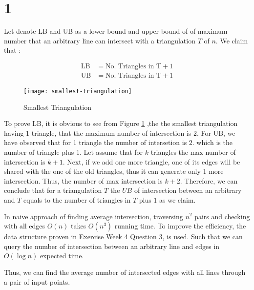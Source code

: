 
\section*{1}

Let denote LB and UB as a lower bound and upper bound of
of maximum number that an arbitrary line can intersect with a
triangulation $T$ of $n$. We claim that :

\begin{align*}
    \mathrm{LB} &= \text{No. Triangles in T} + 1\\
    \mathrm{UB} &= \text{No. Triangles in T} + 1
\end{align*}
\begin{figure}[h]
    \begin{center}
        \texttt{[image: smallest-triangulation]}
        \caption{Smallest Triangulation}
        \label{fig:smallest-triangulation}
    \end{center}
\end{figure}

To prove LB, it is obvious to see from Figure \ref{fig:smallest-triangulation}
,the the smallest triangulation having 1 triangle, that the maximum number of intersection is $2$.
For UB, we have observed that for 1 triangle the number of intersetion is $2$.
which is the number of triangle plus 1. Let assume that for $k$ triangles
the max number of intersection is $k+1$. Next, if we add one more triangle,
one of its edges will be shared with the one of the old triangles, thus
it can generate only 1 more intersection. Thus, the number of max intersection
is $k+2$. Therefore, we can conclude that for a triangulation $T$ the $UB$ of
intersection between an arbitrary and $T$ equals to the number of triangles
in $T$ plus $1$ as we claim.

In naive approach of finding average intersection, traversing $n^2$ pairs and checking with all edges $O(n)$
takes $O(n^3)$ running time. To improve the efficiency, the data structure proven in Exercise Week 4 Question 3,
is used. Such that we can query the number of intersection between an arbitrary line and
edges in $O(\log{n})$ expected time.

Thus, we can find the average number of intersected edges with all lines through
a pair of input points.
